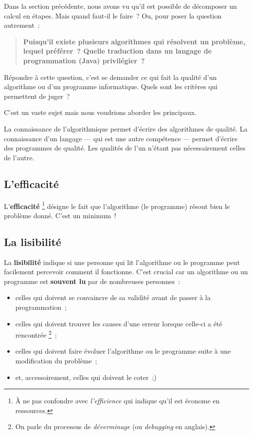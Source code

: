 		Dans la section précédente,
		nous avons vu qu’il est possible de décomposer un calcul en étapes.
		Mais quand faut-il le faire~?	
		Ou, pour poser la question autrement~:
		
			\begin{quote}
				\textbf{Puisqu’il existe plusieurs algorithmes 
				qui résolvent un problème, lequel préférer~? Quelle traduction 
				dans un langage de programmation (Java) privilégier~?}
			\end{quote}
		
		Répondre à cette question, c’est se demander ce qui fait la qualité d’un
		algorithme ou d’un programme informatique.  Quels sont les critères qui
		permettent de juger~?
		
		C’est un vaste sujet mais nous voudrions aborder les principaux.

		La connaissance de l'algorithmique permet d'écrire des algorithmes de 
		qualité. La connaissance d'un langage — qui est une autre compétence —
		permet d'écrire des programmes de qualité. Les qualités de l'un n'étant 
		pas nécessairement celles de l'autre. 
		
		\subsection{L’efficacité}
			
			L’\textbf{efficacité}
			\footnote{%
				À ne pas confondre avec \emph{l’efficience}
				qui indique qu’il est économe en ressources.
			}
			désigne le fait que l’algorithme (le programme) résout%
			bien le problème donné.
			C’est un minimum~!
		
		\subsection{La lisibilité}
		
			La \textbf{lisibilité} indique si une personne qui lit l’algorithme
			ou le programme peut facilement percevoir comment il fonctionne.
			C’est crucial car un algorithme ou un programme est \textbf{souvent
			lu} par de nombreuses personnes~:
			
			\begin{itemize}
			\item
				celles qui doivent se convaincre de sa validité
				avant de passer à la programmation~;
			\item
				celles qui doivent trouver les causes
				d’une erreur lorsque celle-ci a été rencontrée%
				\footnote{%
					On parle du processus de \emph{déverminage}
					(ou \emph{debugging} en anglais).%
				}~;
			\item
				celles qui doivent faire évoluer l’algorithme
				ou le programme suite à une modification
				du problème~;
			\item
				et, accessoirement, celles qui doivent le coter~;)
			\end{itemize}
			
